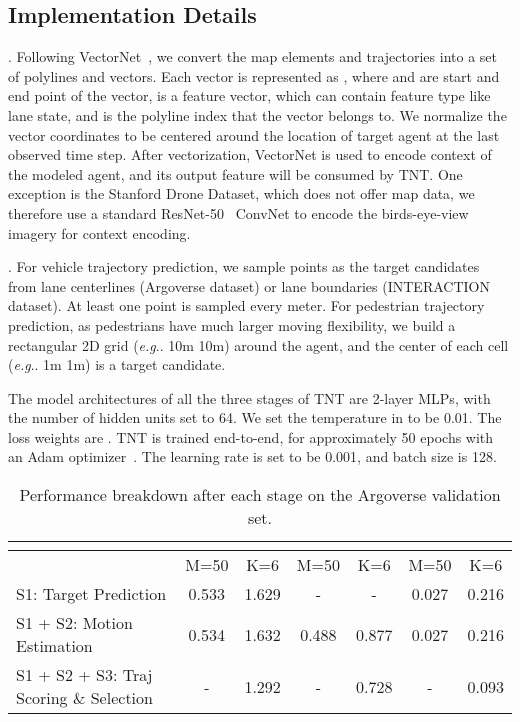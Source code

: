 \documentclass{article}
\makeatletter
\DeclareRobustCommand\onedot{\futurelet\@let@token\@onedot}
\def\@onedot{\ifx\@let@token.\else.\null\fi\xspace}
\newcommand{\model}{TNT\xspace}
\def\eg{\emph{e.g}\onedot} \def\Eg{\emph{E.g}\onedot}
\makeatother
\begin{document}
\subsection{Implementation Details}

. Following VectorNet~\cite{gao2020vectornet}, we convert the map elements and trajectories into a set of polylines and vectors. Each vector is represented as , where  and  are start and end point of the vector,  is a feature vector, which can contain feature type like lane state, and  is the polyline index that the vector belongs to. We normalize the vector coordinates to be centered around the location of target agent at the last observed time step. After vectorization, VectorNet is used to encode context of the modeled agent, and its output feature will be consumed by \model. One exception is the Stanford Drone Dataset, which does not offer map data, we therefore use a standard ResNet-50~\cite{ResNet16} ConvNet to encode the birds-eye-view imagery for context encoding.

. For vehicle trajectory prediction, we sample points as the target candidates from lane centerlines (Argoverse dataset) or lane boundaries (INTERACTION dataset). At least one point is sampled every meter. For pedestrian trajectory prediction, as pedestrians have much larger moving flexibility, we build a rectangular 2D grid (\eg 10m  10m) around the agent, and the center of each cell (\eg 1m  1m) is a target candidate.

 The model architectures of all the three stages of \model are 2-layer MLPs, with the number of hidden units set to 64. We set the temperature  in  to be 0.01. The loss weights are . \model is trained end-to-end, for approximately 50 epochs with an Adam optimizer~\cite{kingma2014adam}. The learning rate is set to be 0.001, and batch size is 128. 

\begin{table}[h]
  \caption{Performance breakdown after each stage on the Argoverse validation set.}
  \label{tbl-breakdown}
  \centering
  \begin{tabular}{l|cccccc}
    \toprule
         &  \multicolumn{2}{c}{}  &  \multicolumn{2}{c}{}  &
         \multicolumn{2}{c}{} \\
    \midrule
        & M=50 & K=6 & M=50 & K=6 & M=50 & K=6\\
    \midrule
    S1: Target Prediction       & 0.533  & 1.629 & -    & - & 0.027 & 0.216\\
    S1 + S2: Motion Estimation   & 0.534  & 1.632 &  0.488 & 0.877 & 0.027 & 0.216 \\
    S1 + S2 + S3: Traj Scoring \& Selection   &  - & 1.292  & - & 0.728 & - & 0.093 \\
    \bottomrule
  \end{tabular}
\end{table}
\end{document}
